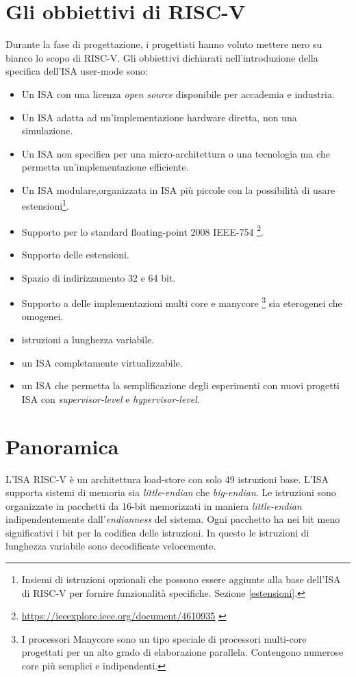 \documentclass[12pt, a4paper]{report}
\begin{document}
\section{Gli obbiettivi di RISC-V}
Durante la fase di progettazione, i progettisti hanno voluto mettere nero su bianco lo scopo di RISC-V. Gli obbiettivi dichiarati nell'introduzione della specifica dell'ISA user-mode sono:
\begin{itemize}
	\item Un ISA con una licenza \textit{open source} disponibile per accademia e industria.
	\item Un ISA adatta ad un'implementazione hardware diretta, non una simulazione.
	\item Un ISA non specifica per una micro-architettura o una tecnologia ma che permetta un'implementazione efficiente.
	\item Un ISA modulare,organizzata in ISA più piccole con la possibilità di usare estensioni\footnote{Insiemi di istruzioni opzionali che possono essere aggiunte alla base dell'ISA di RISC-V per fornire funzionalità specifiche. Sezione \ref{estensioni}.}.
	\item Supporto per lo standard floating-point 2008 IEEE-754 \footnote{ \url{https://ieeexplore.ieee.org/document/4610935} \cite{IEEE754-2008}}.
	\item Supporto delle estensioni. 
	\item Spazio di indirizzamento 32 e 64 bit.
	\item Supporto a delle implementazioni multi core e manycore \footnote{I processori Manycore sono un tipo speciale di processori multi-core progettati per un alto grado di elaborazione parallela. Contengono numerose core più semplici e indipendenti. } sia eterogenei che omogenei.
	\item istruzioni a lunghezza variabile.
	\item un ISA completamente virtualizzabile.
	\item un ISA che permetta la semplificazione degli esperimenti con nuovi progetti ISA con \textit{supervisor-level} e \textit{hypervisor-level}. 
	
\end{itemize}

\section{Panoramica}
L'ISA RISC-V è un architettura load-store con solo 49 istruzioni base. L'ISA supporta sistemi di memoria sia \textit{little-endian} che \textit{big-endian}. Le istruzioni sono organizzate in pacchetti da 16-bit memorizzati in maniera \textit{little-endian} indipendentemente dall'\textit{endianness} del sistema. Ogni pacchetto ha nei bit meno significativi i bit per la codifica delle istruzioni. In questo le istruzioni di lunghezza variabile sono decodificate velocemente.
\end{document}
